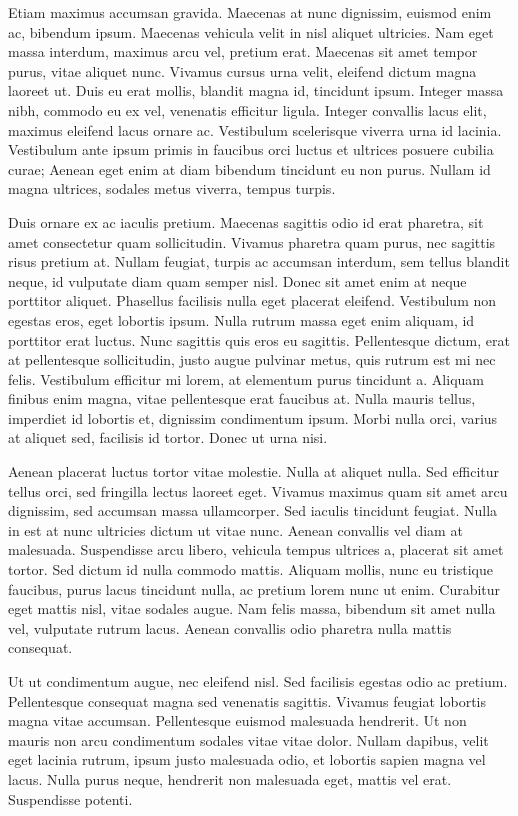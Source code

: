\documentclass[
  letterpaper,
]{scrbook}
\begin{document}
Etiam maximus accumsan gravida. Maecenas at nunc dignissim, euismod enim
ac, bibendum ipsum. Maecenas vehicula velit in nisl aliquet ultricies.
Nam eget massa interdum, maximus arcu vel, pretium erat. Maecenas sit
amet tempor purus, vitae aliquet nunc. Vivamus cursus urna velit,
eleifend dictum magna laoreet ut. Duis eu erat mollis, blandit magna id,
tincidunt ipsum. Integer massa nibh, commodo eu ex vel, venenatis
efficitur ligula. Integer convallis lacus elit, maximus eleifend lacus
ornare ac. Vestibulum scelerisque viverra urna id lacinia. Vestibulum
ante ipsum primis in faucibus orci luctus et ultrices posuere cubilia
curae; Aenean eget enim at diam bibendum tincidunt eu non purus. Nullam
id magna ultrices, sodales metus viverra, tempus turpis.

Duis ornare ex ac iaculis pretium. Maecenas sagittis odio id erat
pharetra, sit amet consectetur quam sollicitudin. Vivamus pharetra quam
purus, nec sagittis risus pretium at. Nullam feugiat, turpis ac accumsan
interdum, sem tellus blandit neque, id vulputate diam quam semper nisl.
Donec sit amet enim at neque porttitor aliquet. Phasellus facilisis
nulla eget placerat eleifend. Vestibulum non egestas eros, eget lobortis
ipsum. Nulla rutrum massa eget enim aliquam, id porttitor erat luctus.
Nunc sagittis quis eros eu sagittis. Pellentesque dictum, erat at
pellentesque sollicitudin, justo augue pulvinar metus, quis rutrum est
mi nec felis. Vestibulum efficitur mi lorem, at elementum purus
tincidunt a. Aliquam finibus enim magna, vitae pellentesque erat
faucibus at. Nulla mauris tellus, imperdiet id lobortis et, dignissim
condimentum ipsum. Morbi nulla orci, varius at aliquet sed, facilisis id
tortor. Donec ut urna nisi.

Aenean placerat luctus tortor vitae molestie. Nulla at aliquet nulla.
Sed efficitur tellus orci, sed fringilla lectus laoreet eget. Vivamus
maximus quam sit amet arcu dignissim, sed accumsan massa ullamcorper.
Sed iaculis tincidunt feugiat. Nulla in est at nunc ultricies dictum ut
vitae nunc. Aenean convallis vel diam at malesuada. Suspendisse arcu
libero, vehicula tempus ultrices a, placerat sit amet tortor. Sed dictum
id nulla commodo mattis. Aliquam mollis, nunc eu tristique faucibus,
purus lacus tincidunt nulla, ac pretium lorem nunc ut enim. Curabitur
eget mattis nisl, vitae sodales augue. Nam felis massa, bibendum sit
amet nulla vel, vulputate rutrum lacus. Aenean convallis odio pharetra
nulla mattis consequat.

Ut ut condimentum augue, nec eleifend nisl. Sed facilisis egestas odio
ac pretium. Pellentesque consequat magna sed venenatis sagittis. Vivamus
feugiat lobortis magna vitae accumsan. Pellentesque euismod malesuada
hendrerit. Ut non mauris non arcu condimentum sodales vitae vitae dolor.
Nullam dapibus, velit eget lacinia rutrum, ipsum justo malesuada odio,
et lobortis sapien magna vel lacus. Nulla purus neque, hendrerit non
malesuada eget, mattis vel erat. Suspendisse potenti.
\end{document}
